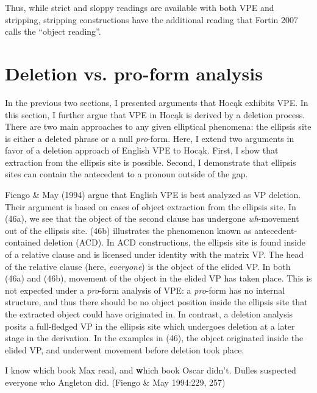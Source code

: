 \documentclass[output=paper]{LSP/langsci}
\begin{document}
Thus, while strict and sloppy readings are available with both VPE and stripping, stripping constructions have the additional reading that Fortin 2007 calls the ``object reading''.


\section{Deletion vs. pro-form analysis}

In the previous two sections, I presented arguments that Hoc\k{a}k exhibits VPE. In this section, I further argue that VPE in Hoc\k{a}k is derived by a deletion process. There are two main approaches to any given elliptical phenomena: the ellipsis site is either a deleted phrase or a null \emph{pro}-form. Here, I extend two arguments in favor of a deletion approach of English VPE to Hoc\k{a}k. First, I show that extraction from the ellipsis site is possible. Second, I demonstrate that ellipsis sites can contain the antecedent to a pronoun outside of the gap.

Fiengo \& May (1994) argue that English VPE is best analyzed as VP deletion. Their argument is based on cases of object extraction from the ellipsis site. In (46a), we see that the object of the second clause has undergone \emph{wh}-movement out of the ellipsis site. (46b) illustrates the phenomenon known as antecedent-contained deletion (ACD). In ACD constructions, the ellipsis site is found inside of a relative clause and is licensed under identity with the matrix VP. The head of the relative clause (here, \emph{everyone}) is the object of the elided VP. In both (46a) and (46b), movement of the object in the elided VP has taken place. This is not expected under a \emph{pro}-form analysis of VPE: a \emph{pro}-form has no internal structure, and thus there should be no object position inside the ellipsis site that the extracted object could have originated in. In contrast, a deletion analysis posits a full-fledged VP in the ellipsis site which undergoes deletion at a later stage in the derivation. In the examples in (46), the object originated inside the elided VP, and underwent movement before deletion took place.

\begin{exe}
\ex
\begin{xlist}
\ex
I know which book Max read, and {\textbf which book} Oscar didn't.
\ex
Dulles suspected everyone who Angleton did. (Fiengo \& May 1994:229, 257)
\end{xlist}
\end{exe}
\end{document}

